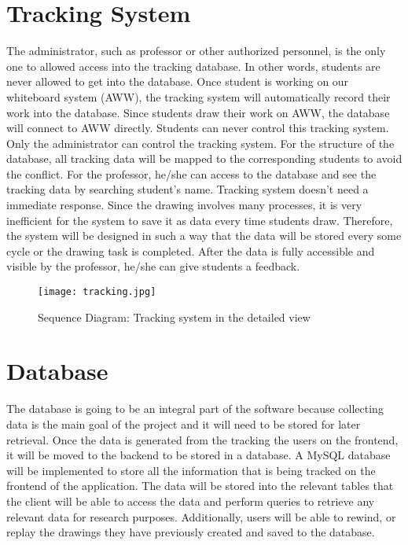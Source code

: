 \documentclass[onecolumn, draftclsnofoot,10pt, compsoc]{IEEEtran}
\begin{document}
\section{Tracking System}

	The administrator, such as professor or other authorized personnel, is the only one to allowed access into the tracking database. In other words, students are never allowed to get into the database. Once student is working on our whiteboard system (AWW), the tracking system will automatically record their work into the database. Since students draw their work on AWW, the database will connect to AWW directly. Students can never control this tracking system. Only the administrator can control the tracking system. For the structure of the database, all tracking data will be mapped to the corresponding students to avoid the conflict. For the professor, he/she can access to the database and see the tracking data by searching student’s name. Tracking system doesn’t need a immediate response. Since the drawing involves many processes, it is very inefficient for the system to save it as data every time students draw. Therefore, the system will be designed in such a way that the data will be stored every some cycle or the drawing task is completed. After the data is fully accessible and visible by the professor, he/she can give students a feedback.

	\begin{figure}[H]
		\begin{center}
			\caption{Sequence Diagram: Tracking system in the detailed view}
			\texttt{[image: tracking.jpg]}
		\end{center}
	\end{figure}

\section{Database}

	The database is going to be an integral part of the software because collecting data is the main goal of the project and it will need to be stored for later retrieval. Once the data is generated from the tracking the users on the frontend, it will be moved to the backend to be stored in a database. A MySQL database will be implemented to store all the information that is being tracked on the frontend of the application. The data will be stored into the relevant tables that the client will be able to access the data and perform queries to retrieve any relevant data for research purposes. Additionally, users will be able to rewind, or replay the drawings they have previously created and saved to the database.
\end{document}
